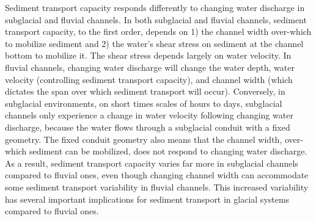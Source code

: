 \documentclass[11pt]{article}
\begin{document}
\laysummary %
Sediment transport capacity responds differently to changing water discharge in subglacial and fluvial channels.
In both subglacial and fluvial channels, sediment transport capacity, to the first order, depends on 1) the channel width over-which to mobilize sediment and 2) the water's shear stress on sediment at the channel bottom to mobilize it.
The shear stress depends largely on water velocity.
In fluvial channels, changing water discharge will change the water depth, water velocity (controlling sediment transport capacity),  and channel width (which dictates the span over which sediment transport  will occur).
Conversely, in subglacial environments, on short times scales of hours to days, subglacial channels only experience a change in water velocity following changing water discharge, because the water flows through a subglacial conduit with a fixed geometry.
The fixed conduit geometry also means that the channel width, over-which sediment can be mobilized, does not respond to changing water discharge.
As a result, sediment transport capacity varies far more in subglacial channels compared to fluvial ones, even though changing channel width can accommodate some sediment transport variability in fluvial channels.
This increased variability has several important implications for sediment transport in glacial systems compared to fluvial ones.
\end{document}
